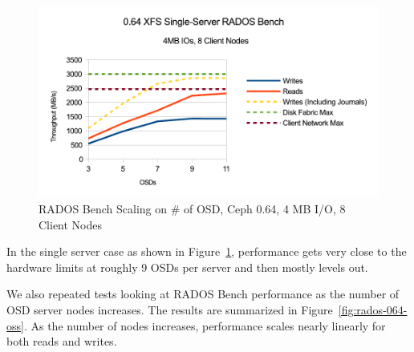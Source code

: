 \documentclass{article}
\begin{document}
\begin{figure}[htb]
\centering
\includegraphics[width=5in]{rados-064-osd}
\caption{RADOS Bench Scaling on \# of OSD, Ceph 0.64, 4 MB I/O, 8 Client Nodes}
\label{fig:rados-064-osd}
\end{figure}

In the single server case as shown in Figure~\ref{fig:rados-064-osd},
performance gets very close to the hardware limits at roughly 9 OSDs per server
and then mostly levels out.

We also repeated tests looking at RADOS Bench performance as the
number of OSD server nodes increases. The results are summarized in
Figure~\ref{fig:rados-064-oss}. As the number of nodes increases, performance
scales nearly linearly for both reads and writes.

\end{document}

